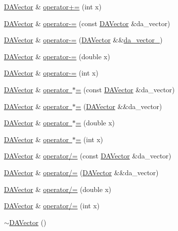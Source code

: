 \begin{DoxyCompactItemize}
\item 
\mbox{\hyperlink{struct_d_a_vector}{D\+A\+Vector}} \& \mbox{\hyperlink{struct_d_a_vector_a16fdc56cf1dcc9107217796634255411}{operator+=}} (int x)
\item 
\mbox{\hyperlink{struct_d_a_vector}{D\+A\+Vector}} \& \mbox{\hyperlink{struct_d_a_vector_ab5a2280559d15f94508c47ed3db7436b}{operator-\/=}} (const \mbox{\hyperlink{struct_d_a_vector}{D\+A\+Vector}} \&da\+\_\+vector)
\item 
\mbox{\hyperlink{struct_d_a_vector}{D\+A\+Vector}} \& \mbox{\hyperlink{struct_d_a_vector_a8084b5f039993f96df4f5c8b8b675d7a}{operator-\/=}} (\mbox{\hyperlink{struct_d_a_vector}{D\+A\+Vector}} \&\&\mbox{\hyperlink{struct_d_a_vector_a359a2e0b8e48c6e481b48b5972e7631c}{da\+\_\+vector\+\_\+}})
\item 
\mbox{\hyperlink{struct_d_a_vector}{D\+A\+Vector}} \& \mbox{\hyperlink{struct_d_a_vector_a6b69dccb8db6428d49a468b2a5ae1c5e}{operator-\/=}} (double x)
\item 
\mbox{\hyperlink{struct_d_a_vector}{D\+A\+Vector}} \& \mbox{\hyperlink{struct_d_a_vector_a97d73e21b9f1beb87cd7d5819e7b06cf}{operator-\/=}} (int x)
\item 
\mbox{\hyperlink{struct_d_a_vector}{D\+A\+Vector}} \& \mbox{\hyperlink{struct_d_a_vector_a3483f9aa176b982614cf3146fd651651}{operator $\ast$=}} (const \mbox{\hyperlink{struct_d_a_vector}{D\+A\+Vector}} \&da\+\_\+vector)
\item 
\mbox{\hyperlink{struct_d_a_vector}{D\+A\+Vector}} \& \mbox{\hyperlink{struct_d_a_vector_a57219674aef4340b85fca475016f3b16}{operator $\ast$=}} (\mbox{\hyperlink{struct_d_a_vector}{D\+A\+Vector}} \&\&da\+\_\+vector)
\item 
\mbox{\hyperlink{struct_d_a_vector}{D\+A\+Vector}} \& \mbox{\hyperlink{struct_d_a_vector_a1e0fb8ff325024c2ea7e7dcbccfaed2f}{operator $\ast$=}} (double x)
\item 
\mbox{\hyperlink{struct_d_a_vector}{D\+A\+Vector}} \& \mbox{\hyperlink{struct_d_a_vector_ae7c52b49d42e0b5dda1ef6bfef843266}{operator $\ast$=}} (int x)
\item 
\mbox{\hyperlink{struct_d_a_vector}{D\+A\+Vector}} \& \mbox{\hyperlink{struct_d_a_vector_ac3993d1627af3e846bc8261e61770df7}{operator/=}} (const \mbox{\hyperlink{struct_d_a_vector}{D\+A\+Vector}} \&da\+\_\+vector)
\item 
\mbox{\hyperlink{struct_d_a_vector}{D\+A\+Vector}} \& \mbox{\hyperlink{struct_d_a_vector_a98c9d829ed63f0cbd48dfb5381684df1}{operator/=}} (\mbox{\hyperlink{struct_d_a_vector}{D\+A\+Vector}} \&\&da\+\_\+vector)
\item 
\mbox{\hyperlink{struct_d_a_vector}{D\+A\+Vector}} \& \mbox{\hyperlink{struct_d_a_vector_a29099ee8cbc4cc93eb4c9dda43de4411}{operator/=}} (double x)
\item 
\mbox{\hyperlink{struct_d_a_vector}{D\+A\+Vector}} \& \mbox{\hyperlink{struct_d_a_vector_a4ff7e67a21ac576a8d6aeed17e6a9ae2}{operator/=}} (int x)
\item 
\mbox{\hyperlink{struct_d_a_vector_a7de44a8dd61f38fe5ae0b0c5b2cbd370}{$\sim$\+D\+A\+Vector}} ()
\end{DoxyCompactItemize}
